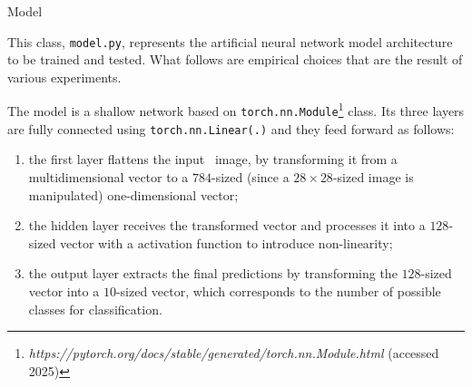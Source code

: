 \begin{section}{Model}
    \par This class, \texttt{model.py}, represents the artificial neural network model architecture to be trained and tested. What follows are empirical choices that are the result of various experiments.\\
    \par The model is a shallow network based on \texttt{torch.nn.Module}\footnote{\textit{https://pytorch.org/docs/stable/generated/torch.nn.Module.html} (accessed 2025)} class. Its three layers are fully connected using \texttt{torch.nn.Linear(.)} and they feed forward as follows:
    \begin{enumerate}
        \item the first layer flattens the input~ image, by transforming it from a multidimensional vector to a $784$-sized (since a $28 \times 28$-sized image is manipulated) one-dimensional vector;
        \item the hidden layer receives the transformed vector and processes it into a $128$-sized vector with a  activation function to introduce non-linearity;
        \item the output layer extracts the final predictions by transforming the $128$-sized vector into a $10$-sized vector, which corresponds to the number of possible classes for classification.
    \end{enumerate}
\end{section}
\clearpage